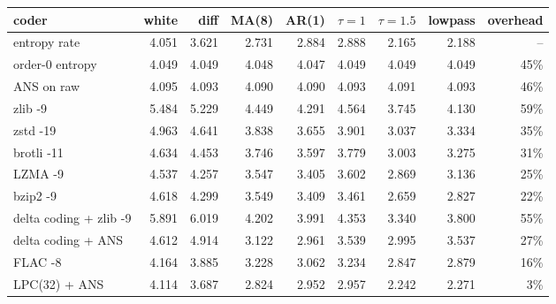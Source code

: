 {\small
\begin{tabular}{@{}lrrrrrrrr@{}}
\toprule
coder & white & diff & MA(8) & AR(1) & $\tau{=}1$ & $\tau{=}1.5$ & lowpass & overhead \\
\midrule
entropy rate & 4.051 & 3.621 & 2.731 & 2.884 & 2.888 & 2.165 & 2.188 & -- \\
order-0 entropy & 4.049 & 4.049 & 4.048 & 4.047 & 4.049 & 4.049 & 4.049 & 45\% \\
\midrule
ANS on raw & 4.095 & 4.093 & 4.090 & 4.090 & 4.093 & 4.091 & 4.093 & 46\% \\
\midrule
zlib -9 & 5.484 & 5.229 & 4.449 & 4.291 & 4.564 & 3.745 & 4.130 & 59\% \\
zstd -19 & 4.963 & 4.641 & 3.838 & 3.655 & 3.901 & 3.037 & 3.334 & 35\% \\
brotli -11 & 4.634 & 4.453 & 3.746 & 3.597 & 3.779 & 3.003 & 3.275 & 31\% \\
LZMA -9 & 4.537 & 4.257 & 3.547 & 3.405 & 3.602 & 2.869 & 3.136 & 25\% \\
bzip2 -9 & 4.618 & 4.299 & 3.549 & 3.409 & 3.461 & 2.659 & 2.827 & 22\% \\
\midrule
delta coding + zlib -9 & 5.891 & 6.019 & 4.202 & 3.991 & 4.353 & 3.340 & 3.800 & 55\% \\
delta coding + ANS & 4.612 & 4.914 & 3.122 & 2.961 & 3.539 & 2.995 & 3.537 & 27\% \\
FLAC -8 & 4.164 & 3.885 & 3.228 & 3.062 & 3.234 & 2.847 & 2.879 & 16\% \\
LPC(32) + ANS & 4.114 & 3.687 & 2.824 & 2.952 & 2.957 & 2.242 & 2.271 & 3\% \\
\bottomrule
\end{tabular}
}
